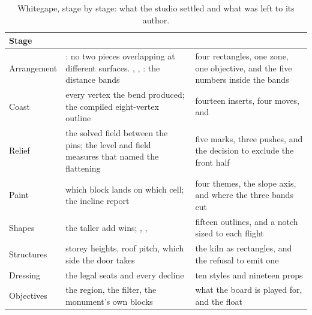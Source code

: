 \begin{table}[htbp]
\caption{Whitegape, stage by stage: what the studio settled and what was left
to its author.}
\label{tab:whitegape-labour}
\small
\begin{tabularx}{\textwidth}{L{2.6cm} Y Y}
\toprule
\textbf{Stage} & \textbf{} & \textbf{} \\
\midrule
Arrangement & : no two pieces overlapping at different surfaces.
  , , : the distance bands &
  four rectangles, one zone, one objective, and the five numbers inside
  the bands \\
Coast & every vertex the bend produced; the compiled eight-vertex outline &
  fourteen inserts, four moves, and  \\
Relief & the solved field between the pins; the level and field measures
  that named the flattening &
  five marks, three pushes, and the decision to exclude the front half \\
Paint & which block lands on which cell; the incline report &
  four themes, the slope axis, and where the three bands cut \\
Shapes & the taller add wins; , ,  &
  fifteen outlines, and a notch sized to each flight \\
Structures & storey heights, roof pitch, which side the door takes &
  the kiln as rectangles, and the refusal to emit one \\
Dressing & the legal seats and every decline &
  ten styles and nineteen props \\
Objectives & the region, the filter, the monument's own blocks &
  what the board is played for, and the float \\
\bottomrule
\end{tabularx}
\end{table}
